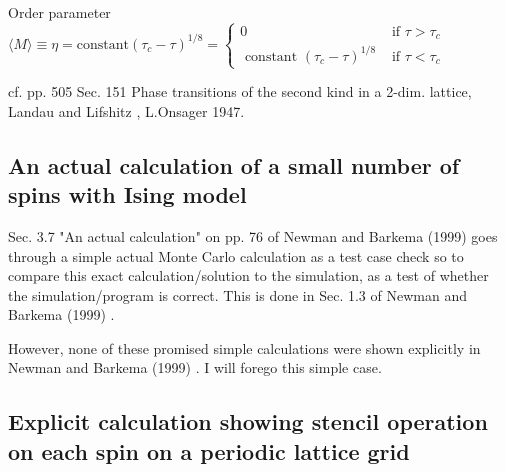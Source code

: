 Order parameter $\langle M \rangle \equiv \eta = \text{constant}(\tau_c - \tau)^{1/8} = \begin{cases} 0 & \text{ if } \tau > \tau_c \\ 
\text{ constant } (\tau_c-\tau)^{1/8} & \text{ if } \tau < \tau_c \end{cases}$  

cf. pp. 505 Sec. 151 Phase transitions of the second kind in a 2-dim. lattice,  Landau and Lifshitz \cite{agat:LaLi1980}, L.Onsager 1947.  

\subsection{An actual calculation of a small number of spins with Ising model}  

Sec. 3.7 "An actual calculation" on pp. 76 of Newman and Barkema (1999) \cite{agat:NeBa1999}
goes through a simple actual Monte Carlo calculation as a test case check so to compare this exact calculation/solution to the simulation, as a test of whether the simulation/program is correct.  This is done in Sec. 1.3 of Newman and Barkema (1999) \cite{agat:NeBa1999}.  

However, none of these promised simple calculations were shown explicitly in Newman and Barkema (1999) \cite{agat:NeBa1999}.  I will forego this simple case.  

\subsection{Explicit calculation showing stencil operation on each spin on a periodic lattice grid}  

